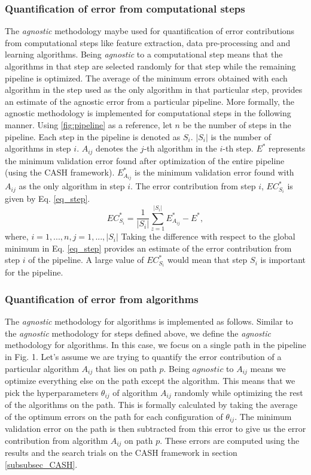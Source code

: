 \subsubsection{Quantification of error from computational steps}
\label{subsubsec_eq_steps}
The \textit{agnostic} methodology maybe used for quantification of error contributions from computational steps like feature extraction, data pre-processing and and learning algorithms. Being \textit{agnostic} to a computational step means that the algorithms in that step are selected randomly for that step while the remaining pipeline is optimized. The average of the minimum errors obtained with each algorithm in the step used as the only algorithm in that particular step, provides an estimate of the agnostic error from a particular pipeline.  
More formally, the agnostic methodology is implemented for computational steps in the following manner. Using \ref{fig:pipeline} as a reference, let $n$ be the number of steps in the pipeline. Each step in the pipeline is denoted as $S_i$. $|S_i|$ is the number of algorithms in step $i$. $A_{ij}$ denotes the $j$-th algorithm in the $i$-th step. $E^*$ represents the minimum validation error found after optimization of the entire pipeline (using the CASH framework). $E_{A_{ij}}^*$ is the minimum  validation error found with $A_{ij}$ as the only algorithm in step $i$. The error contribution from step $i$, $EC_{S_i}^*$ is given by Eq. \ref{eq_step}.
\begin{equation}
\label{eq_step}
EC_{S_i}^* = \frac{1}{|S_i|}\sum_{z=1}^{|S_i|} E_{A_{ij}}^* - E^*,
\end{equation}
where, $i = {1, ..., n}, j = {1, ..., |S_i|}$
Taking the difference with respect to the global minimum in Eq. \ref{eq_step} provides an estimate of the error contribution from step $i$ of the pipeline. A large value of $EC_{S_i}^*$ would mean that step $S_i$ is important for the pipeline.

\subsubsection{Quantification of error from algorithms}
\label{subsubsec_eq_alg}
The \textit{agnostic} methodology for algorithms is implemented as follows. Similar to the \textit{agnostic} methodology for steps defined above, we define the \textit{agnostic} methodology for algorithms. In this case, we focus on a single path in the pipeline in Fig. 1. Let's assume we are trying to quantify the error contribution of a particular algorithm $A_{ij}$ that lies on path $p$. Being $agnostic$ to $A_{ij}$ means we optimize everything else on the path except the algorithm. This means that we pick the hyperparameters $\theta_{ij}$ of algorithm $A_{ij}$ randomly while optimizing the rest of the algorithms on the path. This is formally calculated by taking the average of the optimum errors on the path for each configuration of $\theta_{ij}$. The minimum validation error on the path is then subtracted from this error to give us the error contribution from algorithm $A_{ij}$ on path $p$. These errors are computed using the results and the search trials on the CASH framework in section \ref{subsubsec_CASH}.

